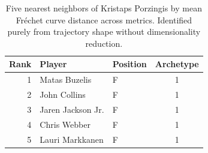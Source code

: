 \begin{table}[htbp]
  \centering\small
  \begin{tabular}{rllc}
    \toprule
    Rank & Player & Position & Archetype \\
    \midrule
    1 & Matas Buzelis & F & 1 \\
    2 & John Collins & F & 1 \\
    3 & Jaren Jackson Jr. & F & 1 \\
    4 & Chris Webber & F & 1 \\
    5 & Lauri Markkanen & F & 1 \\
    \bottomrule
  \end{tabular}
  \caption{Five nearest neighbors of Kristaps Porzingis by mean Fr\'{e}chet curve distance across metrics. Identified purely from trajectory shape without dimensionality reduction.}
  \label{tab:Kristaps_Porzingis_frechet_curve_neighbors}
\end{table}


